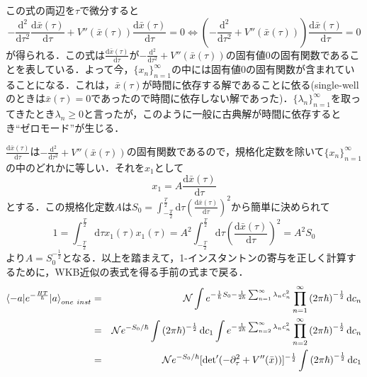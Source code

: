 \documentclass[a4paper,11pt]{jsarticle}
\begin{document}
この式の両辺を$\tau$で微分すると
\begin{equation*}
-\frac{\mathrm{d}^2}{\mathrm{d}\tau^2}\frac{\mathrm{d}\bar{x}(\tau)}{\mathrm{d}\tau}+V''(\bar{x}(\tau))\frac{\mathrm{d}\bar{x}(\tau)}{\mathrm{d}\tau}=0 \Longleftrightarrow \left(-\frac{\mathrm{d}^2}{\mathrm{d}\tau^2}+V''(\bar{x}(\tau))\right)\frac{\mathrm{d}\bar{x}(\tau)}{\mathrm{d}\tau}=0
\end{equation*}
が得られる．この式は$\frac{\mathrm{d}\bar{x}(\tau)}{\mathrm{d}\tau}$が$-\frac{\mathrm{d}^2}{\mathrm{d}\tau^2}+V''(\bar{x}(\tau))$の固有値$0$の固有関数であることを表している．よって今，$\{x_n\}_{n=1}^\infty$の中には固有値$0$の固有関数が含まれていることになる．これは，$\bar{x}(\tau)$が時間に依存する解であることに依る(single-wellのときは$\bar{x}(\tau)=0$であったので時間に依存しない解であった)．$\{\lambda_n\}_{n=1}^\infty$を取ってきたとき$\lambda_n\geq 0$と言ったが，このように一般に古典解が時間に依存するとき``ゼロモード''が生じる．\par
$\frac{\mathrm{d}\bar{x}(\tau)}{\mathrm{d}\tau}$は$-\frac{\mathrm{d}^2}{\mathrm{d}\tau^2}+V''(\bar{x}(\tau))$の固有関数であるので，規格化定数を除いて$\{x_n\}_{n=1}^\infty$の中のどれかに等しい．それを$x_1$として
\begin{equation*}
x_1=A\frac{\mathrm{d}\bar{x}(\tau)}{\mathrm{d}\tau}
\end{equation*}
とする．この規格化定数$A$は$S_0=\int_{-\frac{T}{2}}^{\frac{T}{2}}\mathrm{d}\tau\left(\frac{\mathrm{d}\bar{x}(\tau)}{\mathrm{d}\tau}\right)^2$から簡単に決められて
\begin{equation*}
1=\int_{-\frac{T}{2}}^{\frac{T}{2}}\mathrm{d}\tau x_1(\tau)x_1(\tau)=A^2\int_{-\frac{T}{2}}^{\frac{T}{2}}\mathrm{d}\tau\left(\frac{\mathrm{d}\bar{x}(\tau)}{\mathrm{d}\tau}\right)^2=A^2S_0
\end{equation*}
より$A=S_0^{-\frac{1}{2}}$となる．以上を踏まえて，1-インスタントンの寄与を正しく計算するために，WKB近似の表式を得る手前の式まで戻る．
\begin{eqnarray*}
\braket{-a|e^{-\frac{HT}{\hbar}}|a}_{one{\ }inst}&=&\mathcal{N}\int e^{-\frac{1}{\hbar}S_0-\frac{1}{2\hbar}\sum_{n=1}^\infty \lambda_n c_n^2}\prod_{n=1}^\infty\left(2\pi\hbar\right)^{-\frac{1}{2}}\mathrm{d}c_n \\
&=&\mathcal{N}e^{-S_0/\hbar}\int\left(2\pi\hbar\right)^{-\frac{1}{2}}\mathrm{d}c_1\int e^{-\frac{1}{2\hbar}\sum_{n=2}^\infty \lambda_n c_n^2}\prod_{n=2}^\infty\left(2\pi\hbar\right)^{-\frac{1}{2}}\mathrm{d}c_n \\
&=&\mathcal{N}e^{-S_0/\hbar}[\mathrm{det}'(-\partial_\tau^2+V''(\bar{x}))]^{-\frac{1}{2}}\int\left(2\pi\hbar\right)^{-\frac{1}{2}}\mathrm{d}c_1
\end{eqnarray*}
\end{document}
